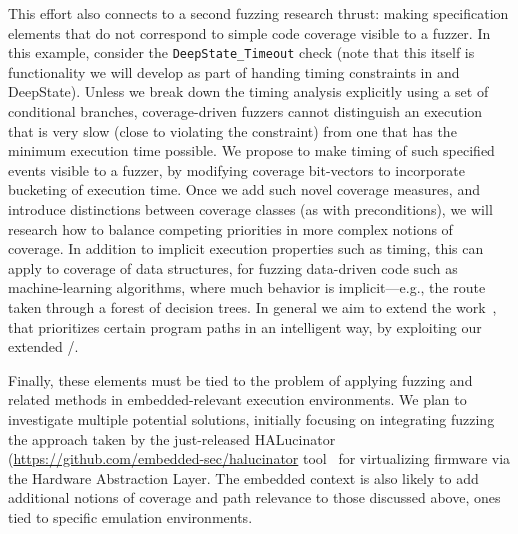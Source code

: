   This effort also connects to a second fuzzing research thrust: making specification elements that do not correspond to simple code coverage visible to a fuzzer.  In this example, consider the {\tt DeepState\_Timeout} check (note that this itself is functionality we will develop as part of handing timing constraints in \framac and DeepState).  Unless we break down the timing analysis explicitly using a set of conditional branches, coverage-driven fuzzers cannot distinguish an execution that is very slow (close to violating the constraint) from one that has the minimum execution time possible.  We propose to make timing of such specified events visible to a fuzzer, by modifying coverage bit-vectors to incorporate bucketing of execution time.  Once we add such novel coverage measures, and introduce distinctions between coverage classes (as with preconditions), we will research how to balance competing priorities in more complex notions of coverage.  In addition to implicit execution properties such as timing, this can apply to coverage of data structures, for fuzzing data-driven code such as machine-learning algorithms, where much behavior is implicit---e.g., the route taken through a forest of decision trees.  In general we aim to extend the work~\cite{aflfast,lemieux2018fairfuzz,vuzzer,zhao2019send,aschermann2019redqueen}, that prioritizes certain program paths in an intelligent way, by exploiting our extended \acsl/\eacsl.

Finally, these elements must be tied to the problem of applying fuzzing and related methods in embedded-relevant execution environments.  We plan to investigate multiple potential solutions, initially focusing on integrating fuzzing the approach taken by the just-released HALucinator (\url{https://github.com/embedded-sec/halucinator} tool~\cite{halucinator} for virtualizing firmware via the Hardware Abstraction Layer.  The embedded context is also likely to add additional notions of coverage and path relevance to those discussed above, ones tied to specific emulation environments.

